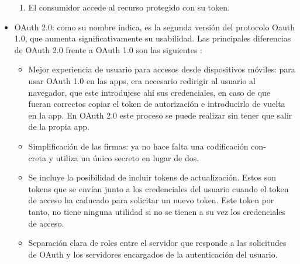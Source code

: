 \begin{itemize}
\begin{enumerate}
\item El consumidor accede al recurso protegido con su token.
\end{enumerate}

\item OAuth 2.0: como su nombre indica, es la segunda versión del protocolo Oauth 1.0, que aumenta significativamente su usabilidad. Las principales diferencias de OAuth 2.0 frente a OAuth 1.0 son las siguientes \citep{oauth2}:
\begin{itemize}
\item Mejor experiencia de usuario para accesos desde dispositivos móviles: para usar OAuth 1.0 en las apps, era necesario redirigir al usuario al navegador, que este introdujese ahí sus credenciales, en caso de que fueran correctos copiar el token de autorización e introducirlo de vuelta en la app. En OAuth 2.0 este proceso se puede realizar sin tener que salir de la propia app.
\item Simplificación de las firmas: ya no hace falta una codificación con-\\ creta y utiliza un único secreto en lugar de dos.
\item Se incluye la posibilidad de incluir tokens de actualización. Estos son tokens que se envían junto a los credenciales del usuario cuando el token de acceso ha caducado para solicitar un nuevo token. Este token por tanto, no tiene ninguna utilidad si no se tienen a su vez los credenciales de acceso.
\item Separación clara de roles entre el servidor que responde a las solicitudes de OAuth y los servidores encargados de la autenticación del usuario.
\end{itemize}


\end{itemize}
